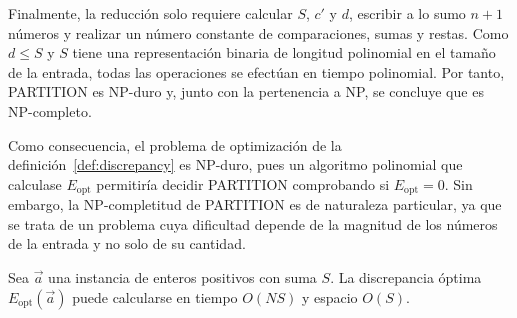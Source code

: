 \begin{demostracion}
	Finalmente, la reducción solo requiere calcular $S$, $c'$ y $d$, escribir a lo sumo $n+1$ números y realizar un número constante de comparaciones, sumas y restas. Como $d\leq S$ y $S$ tiene una representación binaria de longitud polinomial en el tamaño de la entrada, todas las operaciones se efectúan en tiempo polinomial. Por tanto, PARTITION es NP-duro y, junto con la pertenencia a NP, se concluye que es NP-completo.
\end{demostracion}

Como consecuencia, el problema de optimización de la definición~\ref{def:discrepancy} es NP-duro, pues un algoritmo polinomial que calculase $E_{\mathrm{opt}}$ permitiría decidir PARTITION comprobando si $E_{\mathrm{opt}} = 0$. Sin embargo, la NP-completitud de PARTITION es de naturaleza particular, ya que se trata de un problema cuya dificultad depende de la magnitud de los números de la entrada y no solo de su cantidad.

\begin{theorem}\label{thm:dp}
Sea $\vec{a}$ una instancia de enteros positivos con suma $S$. La discrepancia óptima $E_{\mathrm{opt}}(\vec{a})$ puede calcularse en tiempo $O(NS)$ y espacio $O(S)$.
\end{theorem}

